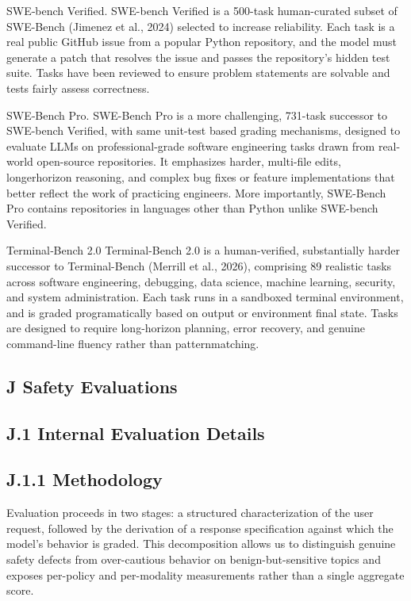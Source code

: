 \documentclass[
  10
]{article}
\begin{document}
SWE‐bench Verified. SWE-bench Verified is a 500-task human-curated
subset of SWE-Bench (Jimenez et al., 2024) selected to increase
reliability. Each task is a real public GitHub issue from a popular
Python repository, and the model must generate a patch that resolves the
issue and passes the repository's hidden test suite. Tasks have been
reviewed to ensure problem statements are solvable and tests fairly
assess correctness.

SWE‐Bench Pro. SWE-Bench Pro is a more challenging, 731-task successor
to SWE-bench Verified, with same unit-test based grading mechanisms,
designed to evaluate LLMs on professional-grade software engineering
tasks drawn from real-world open-source repositories. It emphasizes
harder, multi-file edits, longerhorizon reasoning, and complex bug fixes
or feature implementations that better reflect the work of practicing
engineers. More importantly, SWE-Bench Pro contains repositories in
languages other than Python unlike SWE-bench Verified.

Terminal‐Bench 2.0 Terminal-Bench 2.0 is a human-verified, substantially
harder successor to Terminal-Bench (Merrill et al., 2026), comprising 89
realistic tasks across software engineering, debugging, data science,
machine learning, security, and system administration. Each task runs in
a sandboxed terminal environment, and is graded programatically based on
output or environment final state. Tasks are designed to require
long-horizon planning, error recovery, and genuine command-line fluency
rather than patternmatching.

\subsection{J Safety Evaluations}\label{j-safety-evaluations}

\subsection{J.1 Internal Evaluation
Details}\label{j.1-internal-evaluation-details}

\subsection{J.1.1 Methodology}\label{j.1.1-methodology}

Evaluation proceeds in two stages: a structured characterization of the
user request, followed by the derivation of a response specification
against which the model's behavior is graded. This decomposition allows
us to distinguish genuine safety defects from over-cautious behavior on
benign-but-sensitive topics and exposes per-policy and per-modality
measurements rather than a single aggregate score.
\end{document}
